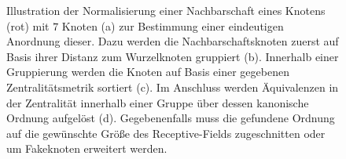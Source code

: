 \begin{figure}[t]
{
}
\caption[Normalisierung]{Illustration der Normalisierung einer Nachbarschaft eines Knotens (rot) mit $7$ Knoten (a) zur Bestimmung einer eindeutigen Anordnung dieser.
Dazu werden die Nachbarschaftsknoten zuerst auf Basis ihrer Distanz zum Wurzelknoten gruppiert (b).
Innerhalb einer Gruppierung werden die Knoten auf Basis einer gegebenen Zentralitätsmetrik sortiert (c).
Im Anschluss werden Äquivalenzen in der Zentralität innerhalb einer Gruppe über dessen kanonische Ordnung aufgelöst (d).
Gegebenenfalls muss die gefundene Ordnung auf die gewünschte Größe des Receptive-Fields zugeschnitten oder um Fakeknoten erweitert werden.}
\label{fig:raeumliche_faltung}
\end{figure}
